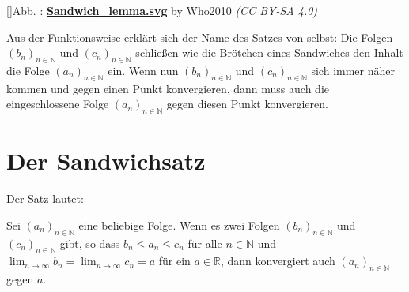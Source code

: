 \documentclass[fontsize=9pt,
               parskip=half-,
               DIV=14,
               listof=chapterentry,
               tocflat]{scrbook}
\newcounter{imagelabel}
\begin{document}
[]{Abb. : \protect\href{https://commons.wikimedia.org/wiki/File:Sandwich_lemma.svg}{\textbf{Sandwich\allowbreak\_lemma.svg}} by Who2010 \textit{(CC BY-SA 4.0)}}\begin{center}
\end{center}

Aus der Funktionsweise erklärt sich der Name des Satzes von selbst: Die Folgen $(b_{n})_{n\in \mathbb {N} }$ und $(c_{n})_{n\in \mathbb {N} }$ schließen wie die Brötchen eines Sandwiches den Inhalt die Folge $(a_{n})_{n\in \mathbb {N} }$ ein. Wenn nun $(b_{n})_{n\in \mathbb {N} }$ und $(c_{n})_{n\in \mathbb {N} }$ sich immer näher kommen und gegen einen Punkt konvergieren, dann muss auch die eingeschlossene Folge $(a_{n})_{n\in \mathbb {N} }$ gegen diesen Punkt konvergieren.
\clearpage
\section{Der Sandwichsatz}

Der Satz lautet:

\begin{theorem*}[Sandwichsatz]
Sei $(a_{n})_{n\in \mathbb {N} }$ eine beliebige Folge. Wenn es zwei Folgen $(b_{n})_{n\in \mathbb {N} }$ und $(c_{n})_{n\in \mathbb {N} }$ gibt, so dass $b_{n}\leq a_{n}\leq c_{n}$ für alle $n\in \mathbb {N} $ und $\lim _{n\rightarrow \infty }b_{n}=\lim _{n\rightarrow \infty }c_{n}=a$ für ein $a\in \mathbb {R} $, dann konvergiert auch $(a_{n})_{n\in \mathbb {N} }$ gegen $a$.

\end{theorem*}
\end{document}
